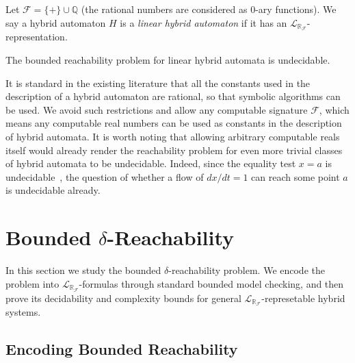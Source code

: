 \documentclass[envcountsect]{llncs}
\newcommand{\lrf}{\mathcal{L}_{\mathbb{R}_{\mathcal{F}}}}
\begin{document}
\begin{definition}
Let $\mathcal{F} = \{+\}\cup \mathbb{Q}$ (the rational numbers are considered as
 0-ary functions). We say a hybrid automaton $H$ is a {\em linear hybrid
automaton} if it has an $\lrf$-representation.
\end{definition}

\begin{proposition}
The bounded reachability problem for linear hybrid automata is undecidable.
\end{proposition}
It is standard in the existing literature that all the constants used in the
description of a hybrid automaton are rational, so that symbolic algorithms can
be used. We avoid such restrictions and allow any
computable signature $\mathcal{F}$, which means  any computable real numbers
can be used as constants in the description of hybrid automata. It is worth
noting that allowing arbitrary computable reals itself would already render the
reachability problem for even more trivial classes of hybrid automata
to be undecidable. Indeed, since the equality test $x=a$ is
undecidable~\cite{CAbook},
the question of whether a flow of $dx/dt = 1$ can reach some point $a$ is
undecidable already. 

\section{Bounded $\delta$-Reachability}\label{main}

In this section we study the bounded $\delta$-reachability problem. We encode
the problem into $\lrf$-formulas through standard bounded model checking, and
then prove its decidability and complexity bounds for general
$\lrf$-represetable hybrid systems. 

\subsection{Encoding Bounded Reachability}\label{encode}
\end{document}

